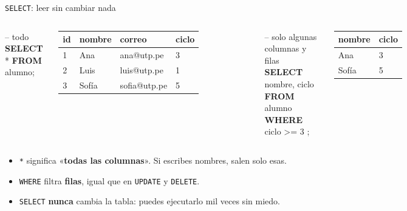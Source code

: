 \documentclass[aspectratio=169,10pt,c]{beamer}
\newcommand{\kw}[1]{\textcolor{utpRojo}{\textbf{#1}}}
\newcommand{\nuevo}[1]{{%
  \setlength{\fboxsep}{1.2pt}%
  \begingroup
  \renewcommand{\kw}[1]{\textcolor{utpNegro}{\textbf{##1}}}%
  \colorbox{yellow!45}{\textcolor{utpNegro}{#1}}%
  \endgroup}}
\newcommand{\com}[1]{\textcolor{utpGris}{-- #1}}
\newenvironment{sqlcode}[1][.86\textwidth]
  {\begin{center}\begin{lrbox}{\sqlbuf}\begin{minipage}{#1}\ttfamily\footnotesize\vspace{6pt}\raggedright}
  {\vspace{6pt}\end{minipage}\end{lrbox}\colorbox{utpGrisClaro}{\usebox{\sqlbuf}}\end{center}}
\begin{document}
\begin{frame}{\texttt{SELECT}: leer sin cambiar nada}
\begin{columns}[T,onlytextwidth]
\begin{sqlcode}[\textwidth]
\com{todo}\\
\kw{SELECT} * \kw{FROM} alumno;
\end{sqlcode}
\vspace{-0.2cm}
\centering\scriptsize\ttfamily
\begin{tabular}{llll}
\toprule
\normalfont\bfseries id & \normalfont\bfseries nombre & \normalfont\bfseries correo & \normalfont\bfseries ciclo \\
\midrule
1 & Ana & ana@utp.pe & 3 \\
2 & Luis & luis@utp.pe & 1 \\
3 & Sofía & sofia@utp.pe & 5 \\
\bottomrule
\end{tabular}
\begin{sqlcode}[\textwidth]
\com{solo algunas columnas y filas}\\
\kw{SELECT} \nuevo{nombre, ciclo} \kw{FROM} alumno\\
\nuevo{\kw{WHERE} ciclo >= 3};
\end{sqlcode}
\vspace{-0.2cm}
\centering\scriptsize\ttfamily
\begin{tabular}{ll}
\toprule
\normalfont\bfseries nombre & \normalfont\bfseries ciclo \\
\midrule
Ana & 3 \\
Sofía & 5 \\
\bottomrule
\end{tabular}
\end{columns}
\vspace{0.45cm}
\small
\begin{itemize}\setlength\itemsep{4pt}
  \item \texttt{*} significa «\textbf{todas las columnas}». Si escribes nombres, salen solo esas.
  \item \texttt{WHERE} filtra \textbf{filas}, igual que en \texttt{UPDATE} y \texttt{DELETE}.
  \item \texttt{SELECT} \textbf{nunca} cambia la tabla: puedes ejecutarlo mil veces sin miedo.
\end{itemize}
\end{frame}
\end{document}
